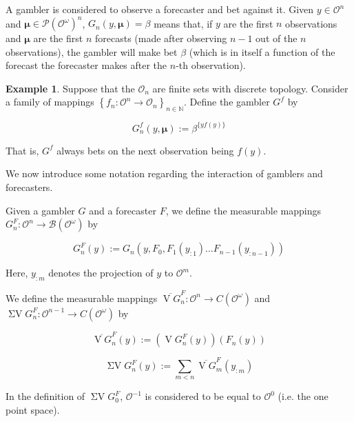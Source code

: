 \documentclass[11pt]{article}
\theoremstyle{definition}
\newtheorem{example}{Example}%
\theoremstyle{plain}
\newcommand{\Nats}{\mathbb{N}}
\newcommand{\PM}{\mathcal{P}}
\newcommand{\Ob}{\mathcal{O}}
\newcommand{\OO}{\Ob^\omega}
\newcommand{\PMO}{\PM(\OO)}
\newcommand{\Gm}{\mathcal{B}}
\newcommand{\GMO}{\Gm(\OO)}
\newcommand{\CO}{C(\OO)}
\DeclareMathOperator{\V}{V}
\DeclareMathOperator{\SV}{\Sigma V}
\newcommand{\BM}{\bm{\mu}}
\begin{document}
A gambler is considered to observe a forecaster and bet against it. Given $y \in \Ob^n$ and $\BM \in \PMO^n$, $G_n\left(y,\BM\right)=\beta$ means that, if $y$ are the first $n$ observations and $\BM$ are the first $n$ forecasts (made after observing $n-1$ out of the $n$ observations), the gambler will make bet $\beta$ (which is in itself a function of the forecast the forecaster makes after the $n$-th observation).

\begin{samepage}
\begin{example}

Suppose that the $\Ob_n$ are finite sets with discrete topology. Consider a family of mappings $\left\{f_n: \Ob^n \rightarrow \Ob_n\right\}_{n\in\Nats}$. Define the gambler $G^f$ by

\begin{equation}
G^f_n(y,\BM):=\beta^{\{yf(y)\}}
\end{equation}

That is, $G^f$ always bets on the next observation being $f(y)$.

\end{example}
\end{samepage}

We now introduce some notation regarding the interaction of gamblers and forecasters. 

Given a gambler $G$ and a forecaster $F$, we define the measurable mappings $G^F_n: \Ob^n \rightarrow \GMO$ by

\begin{equation}
\label{eqn:GF}
G^F_n\left(y\right):=G_n\left(y,F_0,F_1\left(y_{:1}\right) \ldots F_{n-1}\left(y_{:n-1}\right)\right)
\end{equation}

Here, $y_{:m}$ denotes the projection of $y$ to $\Ob^m$.

We define the measurable mappings $\overline{\V G}^F_n: \Ob^n \rightarrow \CO$ and $\SV G^F_n: \Ob^{n-1} \rightarrow \CO$ by

\begin{equation}
\overline{\V G}^F_n\left(y\right):=\left(\V G^F_n\left(y\right)\right)\left(F_n\left(y\right)\right)
\end{equation}

\begin{equation}
\SV G^F_n\left(y\right) := \sum_{m < n} \overline{\V G}^F_m\left(y_{:m}\right)
\end{equation}

In the definition of $\SV G^F_0$, $\Ob^{-1}$ is considered to be equal to $\Ob^0$ (i.e. the one point space).
\end{document}

